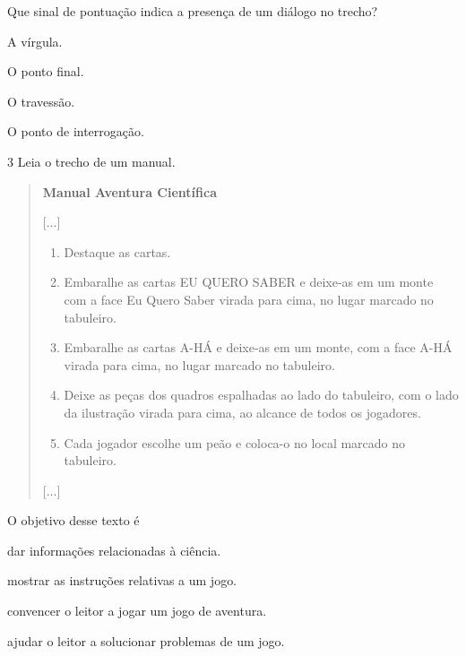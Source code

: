 Que sinal de pontuação indica a presença de um diálogo no trecho?

\begin{escolha}[itemsep=-5pt]
\item
  A vírgula.
\item
  O ponto final.
\item
  O travessão.
\item
  O ponto de interrogação.
\end{escolha}


\num{3} Leia o trecho de um manual.

\begin{quote}
\textbf{Manual Aventura Científica}

{[}...{]}

\begin{enumerate}
\item Destaque as cartas.
\item Embaralhe as cartas EU QUERO SABER e deixe-as em um monte com a
face Eu Quero Saber virada para cima, no lugar marcado no tabuleiro.
\item Embaralhe as cartas A-HÁ e deixe-as em um monte, com a face A-HÁ
virada para cima, no lugar marcado no tabuleiro.
\item Deixe as peças dos quadros espalhadas ao lado do tabuleiro, com o
lado da ilustração virada para cima, ao alcance de todos os jogadores.
\item Cada jogador escolhe um peão e coloca-o no local marcado no
tabuleiro.
\end{enumerate}

{[}...{]}

\end{quote}

O objetivo desse texto é

\begin{escolha}[itemsep=-5pt]
\item dar informações relacionadas à ciência.

\item mostrar as instruções relativas a um jogo.

\item convencer o leitor a jogar um jogo de aventura.

\item ajudar o leitor a solucionar problemas de um jogo.
\end{escolha}

